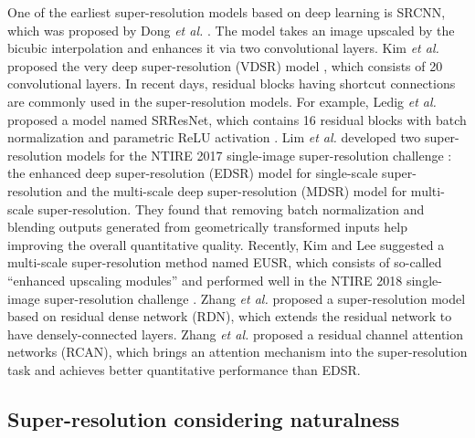 \documentclass[runningheads]{llncs}
\begin{document}
One of the earliest super-resolution models based on deep learning is SRCNN, which was proposed by Dong \textit{et al.} \cite{dong2014learning}.
The model takes an image upscaled by the bicubic interpolation and enhances it via two convolutional layers.
Kim \textit{et al.} proposed the very deep super-resolution (VDSR) model \cite{kim2016accurate}, which consists of 20 convolutional layers.
In recent days, residual blocks having shortcut connections \cite{he2016deep} are commonly used in the super-resolution models.
For example, Ledig \textit{et al.} \cite{ledig2017photo} proposed a model named SRResNet, which contains 16 residual blocks with batch normalization \cite{ioffe2015batch} and parametric ReLU activation \cite{he2015delving}.
Lim \textit{et al.} \cite{lim2017enhanced} developed two super-resolution models for the NTIRE 2017 single-image super-resolution challenge \cite{timofte2017ntire}: the enhanced deep super-resolution (EDSR) model for single-scale super-resolution and the multi-scale deep super-resolution (MDSR) model for multi-scale super-resolution.
They found that removing batch normalization and blending outputs generated from geometrically transformed inputs help improving the overall quantitative quality.
Recently, Kim and Lee \cite{kim2018deep} suggested a multi-scale super-resolution method named EUSR, which consists of so-called ``enhanced upscaling modules'' and performed well in the NTIRE 2018 single-image super-resolution challenge \cite{timofte2018ntire}.
Zhang \textit{et al.} \cite{zhang2018residual} proposed a super-resolution model based on residual dense network (RDN), which extends the residual network to have densely-connected layers.
Zhang \textit{et al.} \cite{zhang2018image} proposed a residual channel attention networks (RCAN), which brings an attention mechanism into the super-resolution task and achieves better quantitative performance than EDSR.

\subsection{Super-resolution considering naturalness}
\end{document}

